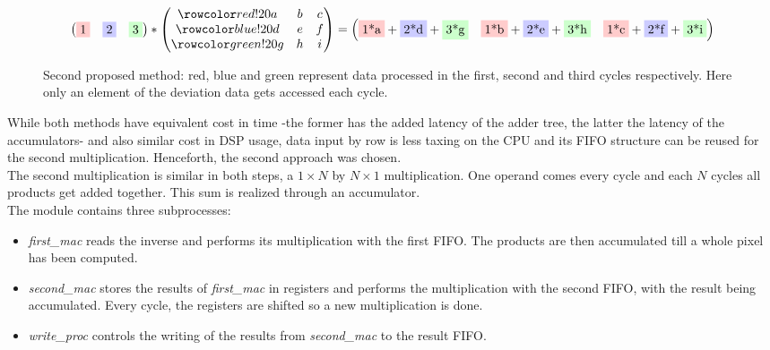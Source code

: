 \begin{figure}[h]%
\[
\begin{pmatrix}
\rb1 & \bb 2 & \gb 3
\end{pmatrix}
*
\begin{pmatrix}
\rr a & b & c \\ 
\br d & e & f \\ 
\gr g & h & i
\end{pmatrix}
=
\begin{pmatrix}
\rb{1*a}+\bb{2*d}+\gb{3*g} & \rb{1*b}+\bb{2*e}+\gb{3*h} & \rb{1*c}+\bb{2*f}+\gb{3*i}
\end{pmatrix} 
\]
\caption[Optional: Short caption to appear in List of Figures]{Second proposed method: red, blue and green represent data processed in the first, second and third cycles respectively. Here only an element of the deviation data gets accessed each cycle.}
\end{figure}

While both methods have equivalent cost in time -the former has the added latency of the adder tree, the latter the latency of the accumulators- and also similar cost in DSP usage, data input by row is less taxing on the CPU and its FIFO structure can be reused for the second multiplication. Henceforth, the second approach was chosen.
\\

The second multiplication is similar in both steps, a \(1 \times N\) by \(N \times 1\) multiplication. One operand comes every cycle and each \(N\) cycles all products get added together. This sum is realized through an accumulator.\\

The module contains three subprocesses:
\begin{itemize}
	\item \emph{first\_mac} reads the inverse and performs its multiplication with the first FIFO. The products are then accumulated till a whole pixel has been computed.
	\item \emph{second\_mac} stores the results of \emph{first\_mac} in registers and performs the multiplication with the second FIFO, with the result being accumulated. Every cycle, the registers are shifted so a new multiplication is done.
	\item \emph{write\_proc} controls the writing of the results from \emph{second\_mac} to the result FIFO.
\end{itemize}



